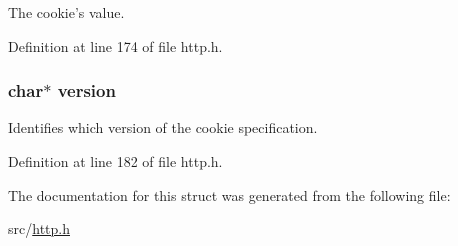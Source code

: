 The cookie's value. 



Definition at line 174 of file http.h.

\hypertarget{structorion__cookie_a56abfaab87c46691c1ef3ad0df23e864}{
\subsubsection[{version}]{\setlength{\rightskip}{0pt plus 5cm}char$\ast$ {\bf version}}}
\label{structorion__cookie_a56abfaab87c46691c1ef3ad0df23e864}


Identifies which version of the cookie specification. 



Definition at line 182 of file http.h.



The documentation for this struct was generated from the following file:\begin{DoxyCompactItemize}
\item 
src/\hyperlink{http_8h}{http.h}\end{DoxyCompactItemize}
